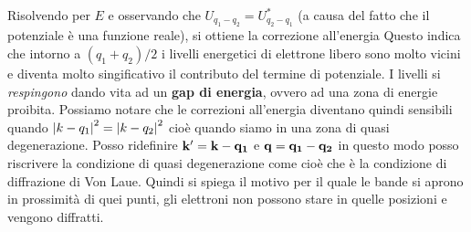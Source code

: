 \documentclass[a4paper,12pt]{article}
\begin{document}
Risolvendo per $E$ e osservando che $U_{q_1-q_2} = U^*_{q_2-q_1}$ (a causa del fatto che il potenziale è una funzione reale), si ottiene la correzione all'energia
Questo indica che intorno a $(q_1+q_2)/2$ i livelli energetici di elettrone libero sono molto vicini e diventa molto singificativo il contributo del termine di potenziale. I livelli si \textit{respingono} dando vita ad un \textbf{gap di energia}, ovvero ad una zona di energie proibita. Possiamo notare che le correzioni all'energia diventano quindi sensibili quando $\abs{k-q_1} ^2 = \abs{k-q_2} ^2$ cioè quando siamo in una zona di quasi degenerazione. Posso ridefinire ${\it\bf k'} = \it\bf k - \it\bf q_1$ e $\it\bf q = \it\bf q_1 - \it\bf q_2$ in questo modo posso riscrivere la condizione di quasi degenerazione come
cioè 
che è la condizione di diffrazione di Von Laue. Quindi si spiega il motivo per il quale le bande si aprono in prossimità di quei punti, gli elettroni non possono stare in quelle posizioni e vengono diffratti.
\end{document}
